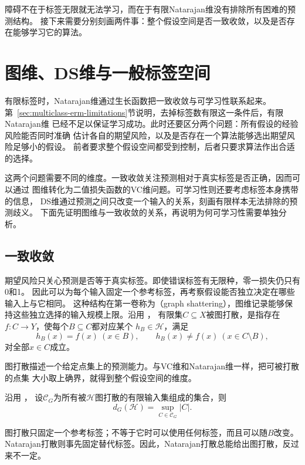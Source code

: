 障碍不在于标签无限就无法学习，而在于有限Natarajan维没有排除所有困难的预测结构。
接下来需要分别刻画两件事：整个假设空间是否一致收敛，以及是否存在能够学习它的算法。

\section{图维、DS维与一般标签空间}
\label{sec:general-multiclass-dimensions}
\label{sec:multiclass-sample-complexity}
有限标签时，Natarajan维通过生长函数把一致收敛与可学习性联系起来。
第~\ref{sec:multiclass-erm-limitations}节说明，去掉标签数有限这一条件后，有限Natarajan维
已经不足以保证学习成功。此时还要区分两个问题：所有假设的经验风险能否同时准确
估计各自的期望风险，以及是否存在一个算法能够选出期望风险足够小的假设。
前者要求整个假设空间都受到控制，后者只要求算法作出合适的选择。

这两个问题需要不同的维度。一致收敛关注预测相对于真实标签是否正确，因而可以通过
图维转化为二值损失函数的VC维问题。可学习性则还要考虑标签本身携带的信息，
DS维通过预测之间只改变一个输入的关系，刻画有限样本无法排除的预测歧义。
下面先证明图维与一致收敛的关系，再说明为何可学习性需要单独分析。

\subsection{一致收敛}

期望风险只关心预测是否等于真实标签。即使错误标签有无限种，零一损失仍只有0和1。
因此可以为每个输入固定一个参考标签，再考察假设能否独立决定在哪些输入上与它相同。
这种结构在第一卷称为（graph shattering），图维记录能够保持这些独立选择的输入规模上限。沿用
，
有限集$C\subseteq X$被图打散，是指存在$f:C\to Y$，使每个$B\subseteq C$都对应某个
$h_B\in\mathcal H$，满足
\[
 h_B(x)=f(x)\ (x\in B),\qquad h_B(x)\neq f(x)\ (x\in C\setminus B),
\]
对全部$x\in C$成立。

图打散描述一个给定点集上的预测能力。与VC维和Natarajan维一样，把可被打散的点集
大小取上确界，就得到整个假设空间的维度。

沿用
，
设$\mathcal C_G$为所有被$\mathcal H$图打散的有限输入集组成的集合，则
\[
 d_G(\mathcal H)=\sup_{C\in\mathcal C_G}|C|.
\]

图打散只固定一个参考标签；不等于它时可以使用任何标签，而且可以随$B$改变。
Natarajan打散则事先固定替代标签。因此，Natarajan打散总能给出图打散，反过来不一定。

